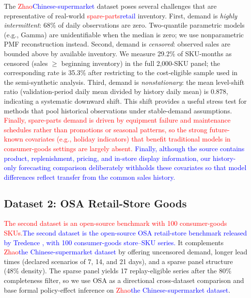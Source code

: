 \documentclass[msom,dblanonrev]{informs4}
\newcommand{\add}[1]{\textcolor{blue}{#1}}
\newcommand{\reduce}[1]{\textcolor{red}{#1}\hspace{0.5em}}
\begin{document}
The \reduce{Zhao}\add{Chinese-supermarket} dataset poses several challenges that are representative of real-world \reduce{spare-parts}\add{retail} inventory.
First, demand is \emph{highly intermittent}: 68\% of daily observations are zero.
Two-quantile parametric models (e.g., Gamma) are unidentifiable when the median is zero; we use nonparametric PMF reconstruction instead.
Second, demand is \emph{censored}: observed sales are bounded above by available inventory.
We measure 29.2\% of SKU-months as censored (sales $\geq$ beginning inventory) in the full 2{,}000-SKU panel; the corresponding rate is 35.3\% after restricting to the cost-eligible sample used in the semi-synthetic analysis.
Third, demand is \emph{nonstationary}: the mean level-shift ratio (validation-period daily mean divided by history daily mean) is 0.878, indicating a systematic downward shift.
This shift provides a useful stress test for methods that pool historical observations under stable-demand assumptions.
\reduce{Finally, spare-parts demand is driven by equipment failure and maintenance schedules rather than promotions or seasonal patterns, so the strong future-known covariates (e.g., holiday indicators) that benefit traditional models in consumer-goods settings are largely absent.}
\add{Finally, although the source contains product, replenishment, pricing, and in-store display information, our history-only forecasting comparison deliberately withholds these covariates so that model differences reflect transfer from the common sales history.}

\subsection{Dataset 2: OSA Retail-Store Goods}

\reduce{The second dataset is an open-source benchmark with 100 consumer-goods SKUs.}\add{The second dataset is the open-source OSA retail-store benchmark released by Tredence \citep{TredenceOSAData2021}, with 100 consumer-goods store--SKU series.}
It complements \reduce{Zhao}\add{the Chinese-supermarket dataset} by offering uncensored demand, longer lead times (declared scenarios of 7, 14, and 21 days), and a sparse panel structure (48\% density).
The sparse panel yields 17 replay-eligible series after the 80\% completeness filter, so we use OSA as a directional cross-dataset comparison and base formal policy-effect inference on \reduce{Zhao}\add{the Chinese-supermarket dataset}.
\end{document}
